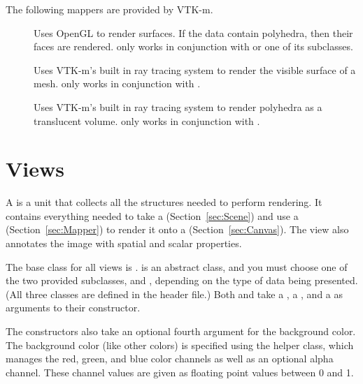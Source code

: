 The following mappers are provided by VTK-m.

\begin{description}
\item[] Uses OpenGL to render surfaces. If the data
  contain polyhedra, then their faces are rendered.
   only works in conjunction with
   or one of its subclasses.
\item[] Uses VTK-m's built in ray tracing
  system to render the visible surface of a mesh.
   only works in conjunction with
  .
\item[] Uses VTK-m's built in ray tracing
  system to render polyhedra as a translucent volume.
   only works in conjunction with
  .
\end{description}



\section{Views}
\label{sec:View}


A  is a unit that collects all the structures needed to
perform rendering. It contains everything needed to take a
 (Section~\ref{sec:Scene}) and use a
 (Section~\ref{sec:Mapper}) to render it onto a
 (Section~\ref{sec:Canvas}). The view also annotates
the image with spatial and scalar properties.

The base class for all views is . 
is an abstract class, and you must choose one of the two provided
subclasses,  and , depending on
the type of data being presented. (All three classes are defined in the
 header file.) Both
 and  take a
, a , and a
 as arguments to their constructor.


The  constructors also take an optional fourth
argument for the background color. The background color (like other colors)
is specified using the  helper class, which manages
the red, green, and blue color channels as well as an optional alpha
channel. These channel values are given as floating point values between 0
and 1.

